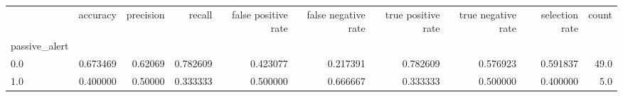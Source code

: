 \begin{tabular}{lrrrrrrrrr}
\toprule
{} &  accuracy &  precision &    recall &  false positive rate &  false negative rate &  true positive rate &  true negative rate &  selection rate &  count \\
passive\_alert &           &            &           &                      &                      &                     &                     &                 &        \\
\midrule
0.0           &  0.673469 &    0.62069 &  0.782609 &             0.423077 &             0.217391 &            0.782609 &            0.576923 &        0.591837 &   49.0 \\
1.0           &  0.400000 &    0.50000 &  0.333333 &             0.500000 &             0.666667 &            0.333333 &            0.500000 &        0.400000 &    5.0 \\
\bottomrule
\end{tabular}
